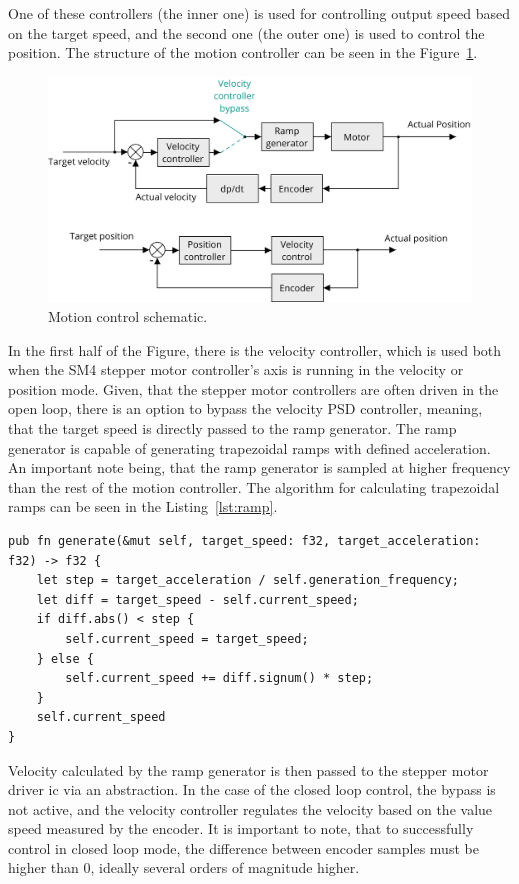 One of these controllers (the inner one) is used for controlling output speed based on the target speed, and the second one (the outer one) is used to control the position.
The structure of the motion controller can be seen in the Figure~\ref{fig:motion_control}.

\begin{figure}[H]
    \centering
    \includegraphics[width=\textwidth]{obrazky/motion_control}
    \caption{Motion control schematic.}
    \label{fig:motion_control}
\end{figure}

In the first half of the Figure, there is the velocity controller, which is used both when the SM4 stepper motor controller's axis is running in the velocity or position mode.
Given, that the stepper motor controllers are often driven in the open loop, there is an option to bypass the velocity PSD controller, meaning, that the target speed is directly passed to the ramp generator.
The ramp generator is capable of generating trapezoidal ramps with defined acceleration.
An important note being, that the ramp generator is sampled at higher frequency than the rest of the motion controller.
The algorithm for calculating trapezoidal ramps can be seen in the Listing~\ref{lst:ramp}.
\begin{lstlisting}[caption={Calculating trapezoidal ramps.},label=lst:ramp]
pub fn generate(&mut self, target_speed: f32, target_acceleration: f32) -> f32 {
    let step = target_acceleration / self.generation_frequency;
    let diff = target_speed - self.current_speed;
    if diff.abs() < step {
        self.current_speed = target_speed;
    } else {
        self.current_speed += diff.signum() * step;
    }
    self.current_speed
}
\end{lstlisting}

Velocity calculated by the ramp generator is then passed to the stepper motor driver \acs{ic} via an abstraction.
In the case of the closed loop control, the bypass is not active, and the velocity controller regulates the velocity based on the value speed measured by the encoder.
It is important to note, that to successfully control in closed loop mode, the difference between encoder samples must be higher than 0, ideally several orders of magnitude higher.

